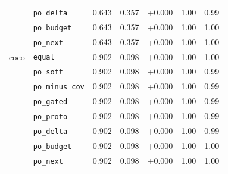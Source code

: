 \begin{table}[t]
\begin{tabular}{llrrrrr}
 & \texttt{po\_delta} & 0.643 & 0.357 & +0.000 & 1.00 & 0.99 \\
 & \texttt{po\_budget} & 0.643 & 0.357 & +0.000 & 1.00 & 1.00 \\
 & \texttt{po\_next} & 0.643 & 0.357 & +0.000 & 1.00 & 1.00 \\
\midrule
coco & \texttt{equal} & 0.902 & 0.098 & +0.000 & 1.00 & 1.00 \\
 & \texttt{po\_soft} & 0.902 & 0.098 & +0.000 & 1.00 & 0.99 \\
 & \texttt{po\_minus\_cov} & 0.902 & 0.098 & +0.000 & 1.00 & 0.99 \\
 & \texttt{po\_gated} & 0.902 & 0.098 & +0.000 & 1.00 & 0.99 \\
 & \texttt{po\_proto} & 0.902 & 0.098 & +0.000 & 1.00 & 0.99 \\
 & \texttt{po\_delta} & 0.902 & 0.098 & +0.000 & 1.00 & 0.99 \\
 & \texttt{po\_budget} & 0.902 & 0.098 & +0.000 & 1.00 & 1.00 \\
 & \texttt{po\_next} & 0.902 & 0.098 & +0.000 & 1.00 & 1.00 \\
\bottomrule
\end{tabular}
\end{table}
